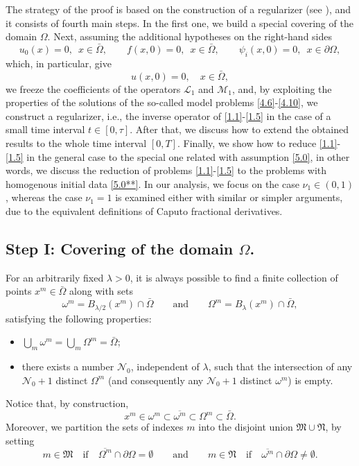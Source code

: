\documentclass[reqno]{amsart}
\theoremstyle{definition}
\numberwithin{equation}{section}
\begin{document}
\noindent The strategy of the proof is based on the construction of a regularizer (see \cite[Section 4]{LSU}),
and it consists of fourth main steps. In the first one, we build a special covering of the domain $\Omega$.
Next, assuming the additional hypotheses on the right-hand sides
\begin{equation}\label{5.0}
u_{0}(x)=0,\,\,\, x\in\bar{\Omega},\qquad f(x,0)=0,\,\,\, x\in\bar{\Omega},\qquad \psi_{i}(x,0)=0,\,\,\, x\in\partial\Omega,
\end{equation}
which, in particular, give
\begin{equation}\label{5.0**}
u(x,0)=0,\quad x\in\bar{\Omega},
\end{equation}
we freeze the coefficients of the operators $\mathcal{L}_{1}$ and $\mathcal{M}_{1}$,
 and, by exploiting the properties of the solutions of the so-called model problems \eqref{4.6}-\eqref{4.10}, we construct a regularizer, i.e., the inverse operator of \eqref{1.1}-\eqref{1.5} in the case of a small time interval $t\in[0,\tau]$. After that, we discuss how to extend the obtained results to the whole time interval $[0,T]$. Finally, we show how to reduce \eqref{1.1}-\eqref{1.5} in the general case to the special one related with assumption \eqref{5.0}, in other words, we discuss the reduction of problems \eqref{1.1}-\eqref{1.5} to
the problems with homogenous initial data \eqref{5.0**}. In our analysis, we focus on the case $\nu_1\in(0,1)$,
whereas the case $\nu_1=1$ is examined either with similar or simpler arguments, due to the equivalent definitions of Caputo fractional derivatives.



\subsection{Step I: Covering of the domain $\Omega$.}\label{s5.1}
For an arbitrarily fixed $\lambda>0$, it is always possible to find
a finite collection of points $x^{m}\in\bar{\Omega}$ along with sets
$$\omega^{m}=B_{\lambda/2}(x^{m})\cap\bar{\Omega}\qquad\text{and}
\qquad\Omega^{m}=B_{\lambda}(x^{m})\cap\bar{\Omega},$$
satisfying the following properties:
\begin{itemize}
\item[(i)] $\bigcup_{m}\omega^{m}=\bigcup_{m}\Omega^{m}=\bar{\Omega}$;
\item[(ii)] there exists a number $\mathcal{N}_0$, independent of $\lambda$, such that the intersection of any $\mathcal{N}_0+1$ distinct $\Omega^{m}$ (and consequently any $\mathcal{N}_0+1$ distinct $\omega^{m}$) is empty.
\end{itemize}
Notice that, by construction,
$$x^m\in \omega^{m}\subset\overline{\omega^{m}}\subset\Omega^{m}\subset\bar{\Omega}.$$
Moreover, we partition the sets of indexes $m$ into the disjoint union
$\mathfrak{M}\cup\mathfrak{N}$, by setting
\[
m\in\mathfrak{M}\quad\text{if}\quad \overline{\Omega^{m}}\cap\partial\Omega=\emptyset\qquad\text{and}\qquad m\in\mathfrak{N}
\quad\text{if}\quad \overline{\omega^{m}}\cap\partial\Omega\neq\emptyset.
\]
\end{document}
